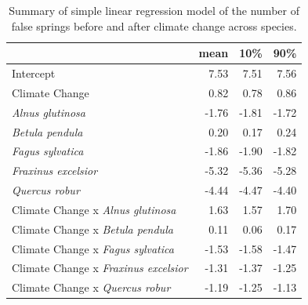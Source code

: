\documentclass{article}\usepackage[]{graphicx}\usepackage[]{color}
\begin{document}
\begin{table}[H]
\centering
\caption{Summary of simple linear regression model of the number of false springs before and after climate change across species.} 
\label{tab:simpfs}
\begin{tabular}{lrrr}
  \hline
 & mean & 10\% & 90\% \\ 
  \hline
Intercept & 7.53 & 7.51 & 7.56 \\ 
  Climate Change & 0.82 & 0.78 & 0.86 \\ 
  \textit{Alnus glutinosa} & -1.76 & -1.81 & -1.72 \\ 
  \textit{Betula pendula} & 0.20 & 0.17 & 0.24 \\ 
  \textit{Fagus sylvatica} & -1.86 & -1.90 & -1.82 \\ 
  \textit{Fraxinus excelsior} & -5.32 & -5.36 & -5.28 \\ 
  \textit{Quercus robur} & -4.44 & -4.47 & -4.40 \\ 
  Climate Change x \textit{Alnus glutinosa} & 1.63 & 1.57 & 1.70 \\ 
  Climate Change x \textit{Betula pendula} & 0.11 & 0.06 & 0.17 \\ 
  Climate Change x \textit{Fagus sylvatica} & -1.53 & -1.58 & -1.47 \\ 
  Climate Change x \textit{Fraxinus excelsior} & -1.31 & -1.37 & -1.25 \\ 
  Climate Change x \textit{Quercus robur} & -1.19 & -1.25 & -1.13 \\ 
   \hline
\end{tabular}
\end{table}
\end{document}
